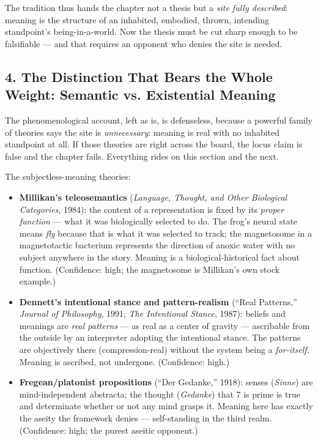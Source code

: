 \documentclass[11pt]{article}
\begin{document}
The tradition thus hands the chapter not a thesis but a \emph{site fully described}: meaning is the structure of an inhabited, embodied, thrown, intending standpoint's being-in-a-world. Now the thesis must be cut sharp enough to be falsifiable — and that requires an opponent who denies the site is needed.

\subsection*{4. The Distinction That Bears the Whole Weight: Semantic vs. Existential Meaning}

The phenomenological account, left as is, is defenseless, because a powerful family of theories says the site is \emph{unnecessary}: meaning is real with no inhabited standpoint at all. If those theories are right across the board, the locus claim is false and the chapter fails. Everything rides on this section and the next.

The subjectless-meaning theories:

\begin{itemize}
\item \textbf{Millikan's teleosemantics} (\emph{Language, Thought, and Other Biological Categories}, 1984): the content of a representation is fixed by its \emph{proper function} — what it was biologically selected to do. The frog's neural state means \emph{fly} because that is what it was selected to track; the magnetosome in a magnetotactic bacterium represents the direction of anoxic water with no subject anywhere in the story. Meaning is a biological-historical fact about function. (Confidence: high; the magnetosome is Millikan's own stock example.)
\item \textbf{Dennett's intentional stance and pattern-realism} (``Real Patterns,'' \emph{Journal of Philosophy}, 1991; \emph{The Intentional Stance}, 1987): beliefs and meanings are \emph{real patterns} — as real as a center of gravity — ascribable from the outside by an interpreter adopting the intentional stance. The patterns are objectively there (compression-real) without the system being a \emph{for-itself}. Meaning is ascribed, not undergone. (Confidence: high.)
\item \textbf{Fregean/\allowbreak{}platonist propositions} (``Der Gedanke,'' 1918): senses (\emph{Sinne}) are mind-independent abstracta; the thought (\emph{Gedanke}) that 7 is prime is true and determinate whether or not any mind grasps it. Meaning here has exactly the aseity the framework denies — self-standing in the third realm. (Confidence: high; the purest aseitic opponent.)
\end{itemize}
\end{document}
